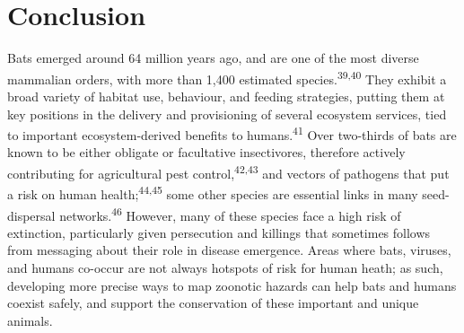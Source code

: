 \documentclass[10pt,oneside]{article}
\begin{document}
\hypertarget{conclusion}{%
\section{Conclusion}\label{conclusion}}

Bats emerged around 64 million years ago, and are one of the most
diverse mammalian orders, with more than 1,400 estimated
species.\textsuperscript{39,40} They exhibit a broad variety of habitat
use, behaviour, and feeding strategies, putting them at key positions in
the delivery and provisioning of several ecosystem services, tied to
important ecosystem-derived benefits to humans.\textsuperscript{41} Over
two-thirds of bats are known to be either obligate or facultative
insectivores, therefore actively contributing for agricultural pest
control,\textsuperscript{42,43} and vectors of pathogens that put a risk
on human health;\textsuperscript{44,45} some other species are essential
links in many seed-dispersal networks.\textsuperscript{46} However, many
of these species face a high risk of extinction, particularly given
persecution and killings that sometimes follows from messaging about
their role in disease emergence. Areas where bats, viruses, and humans
co-occur are not always hotspots of risk for human heath; as such,
developing more precise ways to map zoonotic hazards can help bats and
humans coexist safely, and support the conservation of these important
and unique animals.
\end{document}
